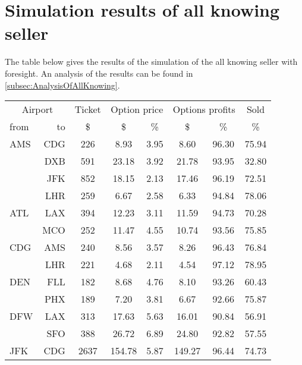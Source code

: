 \chapter{Simulation results of all knowing seller}
\label{app:SimulationResultsAllKnowingSeller}
The table below gives the results of the simulation of the all knowing seller with foresight. An analysis of the results can be found in \autoref{subsec:AnalysisOfAllKnowing}.
\\[2em]
\begin{table}[h]
    \begin{center}
        \begin{tabular}{l r c c c c c c}
            \toprule
            \multicolumn{2}{c}{Airport}  &  Ticket & \multicolumn{2}{c}{Option price} & \multicolumn{2}{c}{Options profits}  &  Sold  \\[.4ex]
            from  &  to  &  \$   &  \$  & \%  &  \$  & \%  & \%  \\
            \midrule
AMS  &  CDG  &     226  &    8.93  &   3.95  &    8.60  &   96.30  &   75.94 \\
~    &  DXB  &     591  &   23.18  &   3.92  &   21.78  &   93.95  &   32.80 \\
~    &  JFK  &     852  &   18.15  &   2.13  &   17.46  &   96.19  &   72.51 \\
~    &  LHR  &     259  &    6.67  &   2.58  &    6.33  &   94.84  &   78.06 \\[.5ex]
ATL  &  LAX  &     394  &   12.23  &   3.11  &   11.59  &   94.73  &   70.28 \\
~    &  MCO  &     252  &   11.47  &   4.55  &   10.74  &   93.56  &   75.85 \\[.5ex]
CDG  &  AMS  &     240  &    8.56  &   3.57  &    8.26  &   96.43  &   76.84 \\
~    &  LHR  &     221  &    4.68  &   2.11  &    4.54  &   97.12  &   78.95 \\[.5ex]
DEN  &  FLL  &     182  &    8.68  &   4.76  &    8.10  &   93.26  &   60.43 \\
~    &  PHX  &     189  &    7.20  &   3.81  &    6.67  &   92.66  &   75.87 \\[.5ex]
DFW  &  LAX  &     313  &   17.63  &   5.63  &   16.01  &   90.84  &   56.91 \\
~    &  SFO  &     388  &   26.72  &   6.89  &   24.80  &   92.82  &   57.55 \\[.5ex]
JFK  &  CDG  &    2637  &  154.78  &   5.87  &  149.27  &   96.44  &   74.73 \\

\end{tabular}
\end{center}
\end{table}
